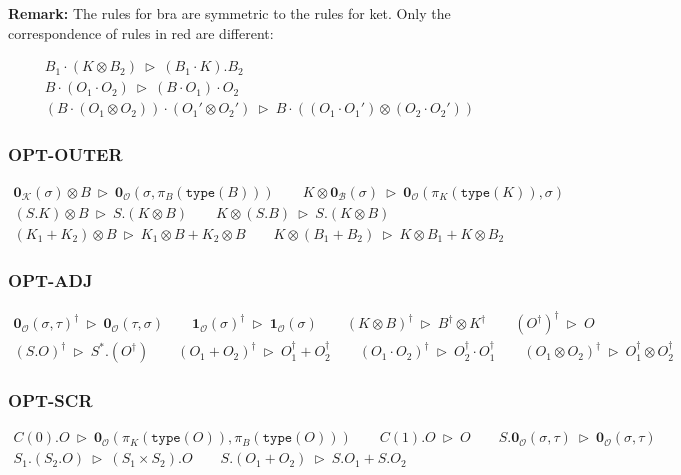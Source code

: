 \documentclass[manuscript, review, timestamp]{acmart}
\newcommand*{\type}{\texttt{type}}
\newcommand*{\reduce}{\ \triangleright\ }
\begin{document}
\textbf{Remark: } The rules for bra are symmetric to the rules for ket. Only the correspondence of rules in red are different:

\begin{gather*}
  B_1 \cdot (K \otimes B_2) \reduce (B_1 \cdot K).B_2 \\
  B \cdot (O_1 \cdot O_2) \reduce (B \cdot O_1) \cdot O_2 \\
  (B \cdot (O_1 \otimes O_2)) \cdot (O_1' \otimes O_2') \reduce B \cdot ((O_1 \cdot O_1') \otimes (O_2 \cdot O_2'))
\end{gather*}

\subsubsection*{\textsf{OPT-OUTER}}
\begin{gather*}
  \mathbf{0}_\mathcal{K}(\sigma) \otimes B \reduce \mathbf{0}_\mathcal{O}(\sigma, \pi_B(\type(B)))
  \qquad
  K \otimes \mathbf{0}_\mathcal{B}(\sigma) \reduce \mathbf{0}_\mathcal{O}(\pi_K(\type(K)), \sigma) \\
  (S.K) \otimes B \reduce S.(K \otimes B)
  \qquad
  K \otimes (S.B) \reduce S.(K \otimes B) \\
  (K_1 + K_2) \otimes B \reduce K_1 \otimes B + K_2 \otimes B
  \qquad
  K \otimes (B_1 + B_2) \reduce K \otimes B_1 + K \otimes B_2
\end{gather*}


\subsubsection*{\textsf{OPT-ADJ}}
\begin{gather*}
  \textbf{0}_\mathcal{O}(\sigma, \tau)^\dagger \reduce \textbf{0}_\mathcal{O}(\tau, \sigma)
  \qquad
  \textbf{1}_\mathcal{O}(\sigma)^\dagger \reduce \textbf{1}_\mathcal{O}(\sigma)
  \qquad
  (K \otimes B)^\dagger \reduce B^\dagger \otimes K^\dagger
  \qquad
  (O^\dagger)^\dagger \reduce O \\
  (S.O)^\dagger \reduce S^*.(O^\dagger)
  \qquad
  (O_1 + O_2)^\dagger \reduce O_1^\dagger + O_2^\dagger
  \qquad
  (O_1 \cdot O_2)^\dagger \reduce O_2^\dagger \cdot O_1^\dagger
  \qquad
  (O_1 \otimes O_2)^\dagger \reduce O_1^\dagger \otimes O_2^\dagger
\end{gather*}

\subsubsection*{\textsf{OPT-SCR}}
\begin{gather*}
  C(0).O \reduce \mathbf{0}_\mathcal{O}(\pi_K(\type(O)), \pi_B(\type(O)))
  \qquad
  C(1).O \reduce O
  \qquad
  S.\textbf{0}_\mathcal{O}(\sigma, \tau) \reduce \textbf{0}_\mathcal{O}(\sigma, \tau) \\
  S_1.(S_2.O) \reduce (S_1 \times S_2).O
  \qquad
  S.(O_1 + O_2) \reduce S.O_1 + S.O_2
\end{gather*}
\end{document}
